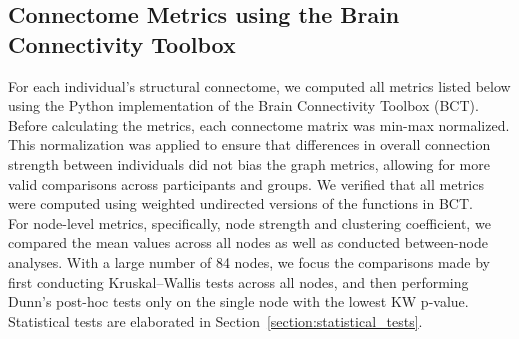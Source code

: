 \subsection{Connectome Metrics using the Brain Connectivity Toolbox}\label{section:connectome_metrics}
For each individual's structural connectome, we computed all metrics listed below using the Python implementation of the Brain Connectivity Toolbox (BCT). \\

Before calculating the metrics, each connectome matrix was min-max normalized. This normalization was applied to ensure that differences in overall connection strength between individuals did not bias the graph metrics, allowing for more valid comparisons across participants and groups. We verified that all metrics were computed using weighted undirected versions of the functions in BCT.\\

For node-level metrics, specifically, node strength and clustering coefficient, we compared the mean values across all nodes as well as conducted between-node analyses. With a large number of 84 nodes, we focus the comparisons made by first conducting Kruskal–Wallis tests across all nodes, and then performing Dunn’s post-hoc tests only on the single node with the lowest KW p-value. Statistical tests are elaborated in Section~\ref{section:statistical_tests}.\\

